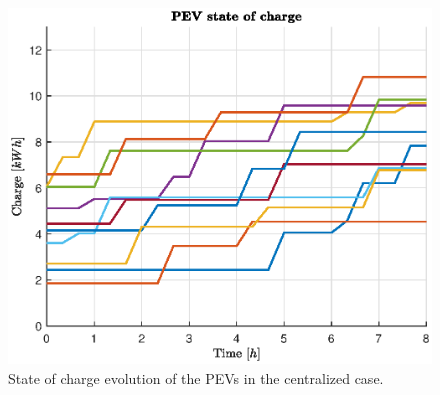 \begin{figure}[H]
    \centering
    \includegraphics[width=\columnwidth]{figures/images/cen_state.eps}
    \caption{State of charge evolution of the PEVs in the centralized case.}
    \label{fig:cen_state}
\end{figure}
